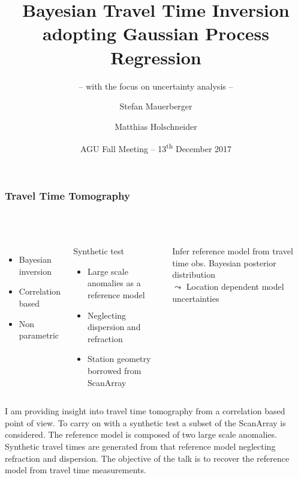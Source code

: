 \documentclass[aspectratio=169, t, 10pt, ignorenonframetext]{beamer}
\title[Correlation based travel time inversion]{Bayesian Travel Time Inversion adopting Gaussian Process Regression}
\subtitle{-- with the focus on uncertainty analysis --}
\author[\tt mauerber@uni-potsdam.de]{Stefan Mauerberger \and Matthias Holschneider}
\institute[Math@UP]{University Potsdam, Institute of Mathematics}
\date[AGU~2017]{AGU Fall Meeting -- 13\textsuperscript{th} December 2017}
\begin{document}

\begin{frame}
    \frametitle{Travel Time Tomography}
    \framesubtitle{~}%
%
\begin{columns}%
%
%
    \begin{itemize}
        \item Bayesian inversion 
        \item Correlation based 
        \item Non parametric 
    \end{itemize}

    \begin{exampleblock}{Synthetic test}
        \begin{itemize}
            \item Large scale anomalies as a reference model 
            \item Neglecting dispersion and refraction
            \item Station geometry borrowed from ScanArray
        \end{itemize}
    \end{exampleblock}

    \begin{alertblock}{Infer reference model from travel time obs.}
        Bayesian posterior distribution \\
        \hfill {\Large $\leadsto$} Location dependent model uncertainties ~
    \end{alertblock}

    \vspace{-10mm}
    
\end{columns}

\end{frame}

I am providing insight into travel time tomography from a correlation based point of view. 
To carry on with a synthetic test a subset of the ScanArray is considered. 
The reference model is composed of two large scale anomalies. 
Synthetic travel times are generated from that reference model neglecting refraction and dispersion. 
The objective of the talk is to recover the reference model from travel time measurements. 
\end{document}
